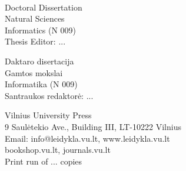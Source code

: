 \pagestyle{empty}

\iffalse   %
\begin{center}   %
NOTES
\end{center}
\newpage
\fi

\cleardoublepage



\vspace{165mm}

\begin{flushleft}
\thesisAuthorName \ \thesisAuthorSurname
	
\thesisTitleEN

Doctoral Dissertation\\
Natural Sciences\\
Informatics (N 009)\\
Thesis Editor: ...


\vspace{3cm}

\thesisTitleLT

Daktaro disertacija\\
Gamtos mokslai\\
Informatika (N 009)\\
Santraukos redaktorė: ...


\end{flushleft}




\vspace{165mm}

{
	\vspace*{\fill}
	
	\centering
Vilnius University Press\\
9 Saulėtekio Ave., Building III, LT-10222 Vilnius\\
Email: info@leidykla.vu.lt, www.leidykla.vu.lt\\
bookshop.vu.lt, journals.vu.lt \\
Print run of ... copies\\
}
